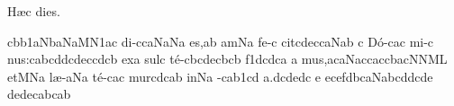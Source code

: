 
\beginhymn H\ae c dies.

\initiumgregorianum
{}%
\sgn {}{\AE}c\bmolle b\episem b1\clivis aN\climacus baN\clivis aM\episem N1\pes ac\egn
\spatium
\sgn di-\bivirga c\spatiumparvum\climacus caN\porrectus aNa\egn
\sgn { }e{s,}\punctum a\augmentum b\egn
\spatium
\Asteriscus
\divisiominor
\spatium
{}am\pes Na\egn
\spatium
\sgn fe-\bivirga c\egn
\sgn cit\bivirga c\torculus dec\climacus caN\punctum a\augmentum b\egn
\spatium
\divisiominima
\spatium
\custos c
\lineaproxima
\sgn D{\'o}-\porrectus cac\egn
\sgn mi-\trivirga c\egn
\sgn nu{s:}\clivis ca\spatiumparvum\quilismapes bc\virga d\augmentum d\pes cd\clivis ec\spatiumparvum\punctum c\pressus dc\augmentum b\egn
\spatium
\divisiomaior
\spatium
\sgn {}ex\punctum a\egn
\sgn sul\punctum c\egn
\sgn t{\'e}-\clivis cb\pes cd\nonspatium\climacus ecb\spatiumparvum\pressus cb\egn
\spatium
\divisiominima
\spatium
\sgn { }{}{}\episem f1\clivis dc\spatiumparvum\virga d\spatiumparvum\punctuminclinatum c\spatiumparvum\punctuminclinatum a\egn
\custos a
\lineaproxima
\sgn mu{s,}\pessubbipunctis acaN\spatiumparvum\pes ac\clivis ca\virga c\climacus cba\clivis cN\clivis NM\augmentum L\egn
\spatium
\divisiomaior
\spatium
\sgn {}et\Salicus MNa\egn
\spatium
\sgn l{\ae}-\porrectus aNa\egn
\sgn t{\'e}-\clivis ca\trivirga c\egn
\sgn mur\pes cd\spatiumparvum\punctuminclinatum c\spatiumparvum\punctuminclinatum a\augmentum  b\egn
\spatium
\divisiominor
\spatium
\sgn {}in\pes Na\egn
\spatium
{}-\clivis ca\spatiumparvum\episem b1\pes cd\egn
\sgn {}a.\clivis dc\pessubbipunctis dedc\egn
\spatium
\divisiominima
\spatium
\custos e
\lineaproxima
\sgn { }{}{}\clivis ec\pes ef\spatiumparvum\punctuminclinatum d\spatiumparvum\punctuminclinatum b\climacus caN\quilismascandicus abc\nonspatium\virga d\augmentum d\Salicus cde\egn
\spatium
\divisiominima
\spatium
\sgn { }{}{}\torculusresupinus dede\spatiumparvum\punctuminclinatum c\spatiumparvum\punctuminclinatum a\spatiumparvum\quilismatorculus bca\augmentum b\egn
\spatium
\Finisgregoriana

